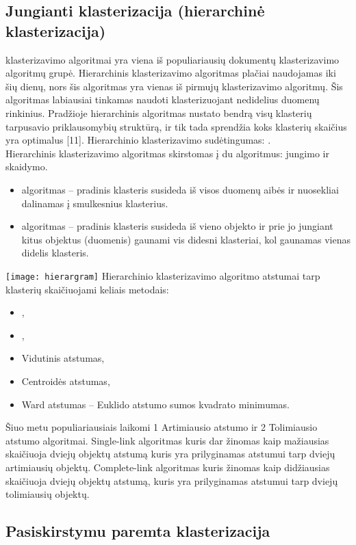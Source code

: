 \documentclass{VUMIFInfKursinis}
\begin{document}
	\subsection{Jungianti klasterizacija (hierarchinė klasterizacija)}
		 klasterizavimo algoritmai yra viena iš populiariausių dokumentų klasterizavimo algoritmų grupė. Hierarchinis klasterizavimo algoritmas plačiai naudojamas iki šių dienų, nors šis algoritmas yra vienas iš pirmujų klasterizavimo algoritmų. Šis algoritmas labiausiai tinkamas naudoti klasterizuojant nedidelius duomenų rinkinius. Pradžioje hierarchinis algoritmas nustato bendrą visų klasterių tarpusavio priklausomybių struktūrą, ir tik tada sprendžia koks klasterių skaičius yra optimalus [11]. Hierarchinio klasterizavimo sudėtingumas: .\\
		Hierarchinis klasterizavimo algoritmas skirstomas į du algoritmus: jungimo ir skaidymo.
		\begin{itemize}
			\item {} algoritmas – pradinis klasteris susideda iš visos duomenų aibės ir nuosekliai dalinamas į smulkesnius klasterius.
			\item {} algoritmas – pradinis klasteris susideda iš vieno objekto ir prie jo jungiant kitus objektus (duomenis) gaunami vis didesni klasteriai, kol gaunamas vienas didelis klasteris.
		\end{itemize}
		\texttt{[image: hierargram]}
		Hierarchinio klasterizavimo algoritmo atstumai tarp klasterių skaičiuojami keliais metodais:
		\begin{itemize}
			\item {},
			\item {},
			\item Vidutinis atstumas,
			\item Centroidės atstumas,
			\item Ward atstumas – Euklido atstumo sumos kvadrato minimumas.
		\end{itemize}
		Šiuo metu populiariausiais laikomi 1 Artimiausio atstumo ir 2 Tolimiausio atstumo algoritmai.  Single-link algoritmas kuris dar žinomas kaip mažiausias skaičiuoja dviejų objektų atstumą kuris yra prilyginamas atstumui tarp dviejų artimiausių objektų. Complete-link algoritmas kuris žinomas kaip didžiausias skaičiuoja dviejų objektų atstumą, kuris yra prilyginamas atstumui tarp dviejų tolimiausių objektų.
	\subsection{Pasiskirstymu paremta klasterizacija}
\end{document}
